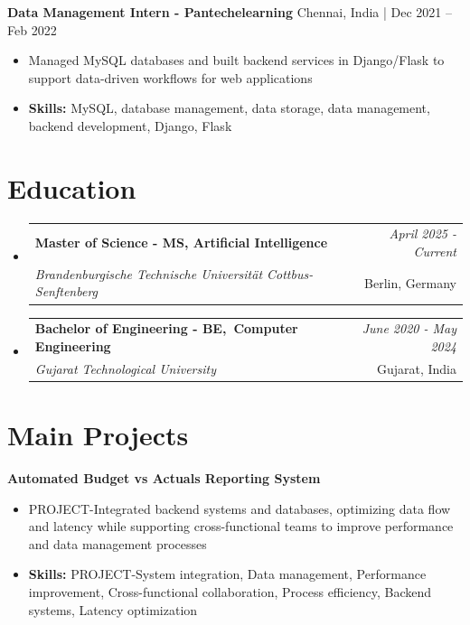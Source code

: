 \documentclass[a4paper,11pt]{article}
\makeatletter
\newcommand{\resumeSubheading}[4]{
\vspace{0.5mm}\item
    \begin{tabular*}{0.98\textwidth}[t]{l@{\extracolsep{\fill}}r}
        \textbf{#1} & \textit{\footnotesize{#4}} \\
        \textit{\footnotesize{#3}} &  \footnotesize{#2}\\
    \end{tabular*}
    \vspace{-2.4mm}
}
\makeatother
\begin{document}
\vspace{1mm}
  \textbf{ Data Management Intern - Pantechelearning} \hfill Chennai, India | Dec 2021 -- Feb 2022
\vspace{-1.5mm} %
\begin{itemize}
  \item Managed MySQL databases and built backend services in Django/Flask to support data-driven workflows for web applications
\vspace{-2mm}
  \item \textbf{Skills:} MySQL, database management, data storage, data management, backend development, Django, Flask
\end{itemize}\section{\textbf{Education}}
\vspace{-0.4mm}

\begin{itemize}
\resumeSubheading
{Master of Science - MS, Artificial Intelligence }{Berlin, Germany}
{Brandenburgische Technische Universität Cottbus-Senftenberg  }{April 2025 - Current}

\vspace{1.0mm} %
\resumeSubheading
{Bachelor of Engineering - BE, Computer Engineering  }{Gujarat, India}
{Gujarat Technological University }{June 2020 - May 2024}

\end{itemize}
\section{\textbf{Main Projects}}

\vspace{1mm}
  \textbf{Automated Budget vs Actuals Reporting System  } 
\vspace{-1.5mm} %
\begin{itemize}
  \item PROJECT-Integrated backend systems and databases, optimizing data flow and latency while supporting cross-functional teams to improve performance and data management processes
\vspace{-3mm}
  \item \textbf{Skills:} PROJECT-System integration, Data management, Performance improvement, Cross-functional collaboration, Process efficiency, Backend systems, Latency optimization
\end{itemize}
\end{document}
